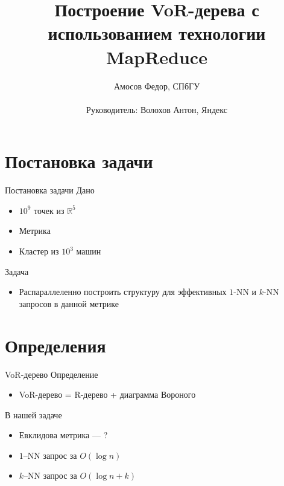 \documentclass[14pt, fleqn, xcolor={dvipsnames, table}]{beamer}
\title{Построение VoR-дерева с использованием технологии MapReduce\\\small{}}
\author[]{
    \small{
        Амосов Федор, СПбГУ\\
        ~\\
        Руководитель: Волохов Антон, Яндекс
    }
}
\date{}
\begin{document}
    \begin{frame}
        \maketitle
        \small
    \end{frame}

    \section{Постановка задачи}  
    
        \begin{frame}{Постановка задачи}
            Дано
            \begin{itemize}
                \item $10^9$ точек из $\mathbb{R}^5$
                \item Метрика
                \item Кластер из $10^3$ машин
            \end{itemize}  
            Задача
            \begin{itemize}
                \item Распараллеленно построить структуру для эффективных $1$-NN и $k$-NN запросов в данной метрике
            \end{itemize}         
        \end{frame}
        
    \section{Определения}
        
        \begin{frame}{VoR-дерево}
            Определение
            \begin{itemize}
                \item VoR-дерево = R-дерево + диаграмма Вороного
            \end{itemize}  
            В нашей задаче
            \begin{itemize}       
                \item Евклидова метрика --- ?
                \item $1$--NN запрос за $O(\log n)$
                \item $k$--NN запрос за $O(\log n + k)$
            \end{itemize}                
        \end{frame}
        
\end{document}
